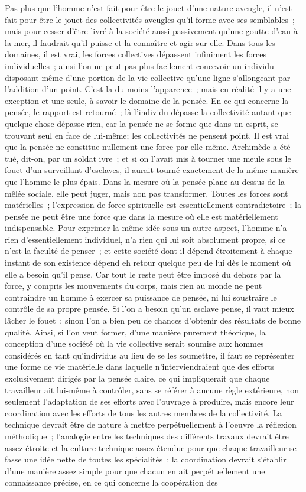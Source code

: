 \documentclass[french,twoside]{book} %
\begin{document}
Pas plus que l'homme n'est fait pour être le jouet d'une nature aveugle, il n'est fait pour être le jouet des collectivités aveugles qu'il forme avec ses semblables ; mais pour cesser d'être livré à la société aussi passivement qu’une goutte d'eau à la mer, il faudrait qu'il puisse et la connaître et agir sur elle. Dans tous les domaines, il est vrai, les forces collectives dépassent infiniment les forces individuelles ; ainsi l'on ne peut pas plus facilement concevoir un individu disposant même d'une portion de la vie collective qu'une ligne s'allongeant par l'addition d'un point. C'est la du moins l'apparence ; mais en réalité il y a une exception et une seule, à savoir le domaine de la pensée. En ce qui concerne la pensée, le rapport est retourné ; là l'individu dépasse la collectivité autant que quelque chose dépasse rien, car la pensée ne se forme que dans un esprit, se trouvant seul en face de lui-même; les collectivités ne pensent point. Il est vrai que la pensée ne constitue nullement une force par elle-même. Archimède a été tué, dit-on, par un soldat ivre ; et si on l'avait mis à tourner une meule sous le fouet d'un surveillant d'esclaves, il aurait tourné exactement de la même manière que l'homme le plus épais. Dans la mesure où la pensée plane au-dessus de la mêlée sociale, elle peut juger, mais non pas transformer. Toutes les forces sont matérielles ; l'expression de force spirituelle est essentiellement contradictoire ; la pensée ne peut être une force que dans la mesure où elle est matériellement indispensable. Pour exprimer la même idée sous un autre aspect, l'homme n'a rien d'essentiellement individuel, n'a rien qui lui soit absolument propre, si ce n'est la faculté de penser ; et cette société dont il dépend étroitement à chaque instant de son existence dépend eh retour quelque peu de lui dès le moment où elle a besoin qu'il pense. Car tout le reste peut être imposé du dehors par la force, y compris les mouvements du corps, mais rien au monde ne peut contraindre un homme à exercer sa puissance de pensée, ni lui soustraire le contrôle de sa propre pensée. Si l'on a besoin qu'un esclave pense, il vaut mieux lâcher le fouet ; sinon l'on a bien peu de chances d'obtenir des résultats de bonne qualité. Ainsi, si l'on veut former, d'une manière purement théorique, la conception d'une société où la vie collective serait soumise aux hommes considérés en tant qu'individus au lieu de se les soumettre, il faut se représenter une forme de vie matérielle dans laquelle n'interviendraient que des efforts exclusivement dirigés par la pensée claire, ce qui impliquerait que chaque travailleur ait lui-même à contrôler, sans se référer à aucune règle extérieure, non seulement l'adaptation de ses efforts avec l'ouvrage à produire, mais encore leur coordination avec les efforts de tous les autres membres de la collectivité. La technique devrait être de nature à mettre perpétuellement à l'oeuvre la réflexion méthodique ; l'analogie entre les techniques des différents travaux devrait être assez étroite et la culture technique assez étendue pour que chaque travailleur se fasse une idée nette de toutes les spécialités ; la coordination devrait s'établir d'une manière assez simple pour que chacun en ait perpétuellement une connaissance précise, en ce qui concerne la coopération des 
\end{document}
